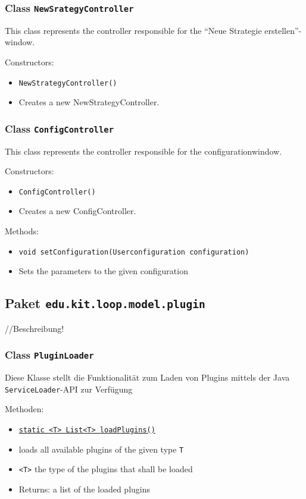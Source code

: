 \documentclass[parskip=full,11pt]{scrartcl}
\begin{document}
\subsubsection{Class \texttt{NewSrategyController}}
This class represents the controller responsible for the \enquote{Neue Strategie erstellen}-window.

Constructors:
\begin{itemize}\itemsep -10pt
\item \texttt{NewStrategyController()}
\item[] Creates a new NewStrategyController.
\end{itemize}

\subsubsection{Class \texttt{ConfigController}}
This class represents the controller responsible for the configurationwindow.

Constructors:
\begin{itemize}\itemsep -10pt
\item \texttt{ConfigController()}
\item[] Creates a new ConfigController.
\end{itemize}

Methods:
\begin{itemize}\itemsep -10pt
\item \texttt{void setConfiguration(Userconfiguration configuration)}
\item[] Sets the parameters to the given configuration

\end{itemize}

\subsection{Paket \texttt{edu.kit.loop.model.plugin}}
//Beschreibung!

\subsubsection{Class \texttt{PluginLoader}}

Diese Klasse stellt die Funktionalität zum Laden von Plugins mittels der Java \texttt{ServiceLoader}-API zur Verfügung

Methoden:

\begin{itemize}\itemsep -10pt
	\item \underline{\texttt{static <T> List<T> loadPlugins()}}
	\item[] loads all available plugins of the given type \texttt{T}
	\item[] \texttt{<T>} the type of the plugins that shall be loaded
	\item[]Returns: a list of the loaded plugins
\end{itemize}
\end{document}
